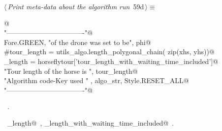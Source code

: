 \documentclass[11.5pt]{report}
\begin{document}
\vspace{-0.8cm} \newchunk
\begin{flushleft} \small
\begin{minipage}{\linewidth}\label{scrap89}\raggedright\small
{} $\langle\,${\itshape Print meta-data about the algorithm run}\nobreak\ {\footnotesize {59d}}$\,\rangle\equiv$
\vspace{-1ex}
\begin{list}{}{} \item
\mbox{}\verb@   @\\
\mbox{}\verb@print "----------------------------------"@\\
\mbox{}\verb@print Fore.GREEN, "\nSpeed of the drone was set to be", phi@\\
\mbox{}\verb@#tour_length = utils_algo.length_polygonal_chain( zip(xhs, yhs))@\\
\mbox{}\verb@tour_length = horseflytour['tour_length_with_waiting_time_included']@\\
\mbox{}\verb@print "Tour length of the horse is ",  tour_length@\\
\mbox{}\verb@print "Algorithm code-Key used "    , algo_str, Style.RESET_ALL@\\
\mbox{}\verb@print "----------------------------------\n"@\\
\mbox{}\verb@@{\NWsep}
\end{list}
\vspace{-1.5ex}
\footnotesize
\begin{list}{}{\setlength{\itemsep}{-\parsep}\setlength{\itemindent}{-\leftmargin}}
\item \NWtxtMacroRefIn\ .
\item \NWtxtIdentsUsed\nobreak\  \verb@tour_length@\nobreak\ , \verb@tour_length_with_waiting_time_included@\nobreak\ .
\item{}
\end{list}
\end{minipage}\vspace{4ex}
\end{flushleft}
\end{document}
